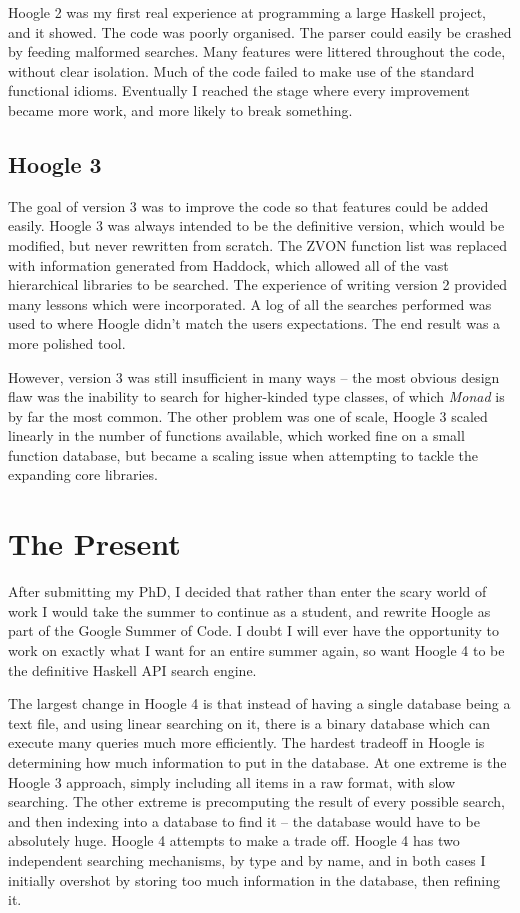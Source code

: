 \documentclass{tmr}
\begin{document}
Hoogle 2 was my first real experience at programming a large Haskell project, and it showed. The code was poorly organised. The parser could easily be crashed by feeding malformed searches. Many features were littered throughout the code, without clear isolation. Much of the code failed to make use of the standard functional idioms. Eventually I reached the stage where every improvement became more work, and more likely to break something.

\subsection{Hoogle 3}

The goal of version 3 was to improve the code so that features could be added easily. Hoogle 3 was always intended to be the definitive version, which would be modified, but never rewritten from scratch. The ZVON function list was replaced with information generated from Haddock, which allowed all of the vast hierarchical libraries to be searched. The experience of writing version 2 provided many lessons which were incorporated. A log of all the searches performed was used to where Hoogle didn't match the users expectations. The end result was a more polished tool.

However, version 3 was still insufficient in many ways -- the most obvious design flaw was the inability to search for higher-kinded type classes, of which \textit{Monad} is by far the most common. The other problem was one of scale, Hoogle 3 scaled linearly in the number of functions available, which worked fine on a small function database, but became a scaling issue when attempting to tackle the expanding core libraries.

\section{The Present}

After submitting my PhD, I decided that rather than enter the scary world of work I would take the summer to continue as a student, and rewrite Hoogle as part of the Google Summer of Code. I doubt I will ever have the opportunity to work on exactly what I want for an entire summer again, so want Hoogle 4 to be the definitive Haskell API search engine.

The largest change in Hoogle 4 is that instead of having a single database being a text file, and using linear searching on it, there is a binary database which can execute many queries much more efficiently. The hardest tradeoff in Hoogle is determining how much information to put in the database. At one extreme is the Hoogle 3 approach, simply including all items in a raw format, with slow searching. The other extreme is precomputing the result of every possible search, and then indexing into a database to find it -- the database would have to be absolutely huge. Hoogle 4 attempts to make a trade off. Hoogle 4 has two independent searching mechanisms, by type and by name, and in both cases I initially overshot by storing too much information in the database, then refining it.
\end{document}
